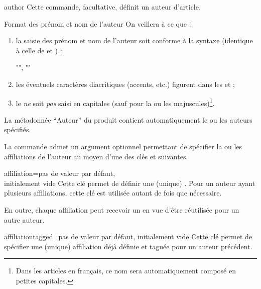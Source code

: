 \documentclass[french,nolocaltoc]{nwejmart}
\newtheorem[style=definition]{fait}
\newtheorem[title=expérience]{experience}
\newtheorem[title-plural=anneaux]{anneau}
\newtheorem[title=idéal,title-plural=idéaux]{ideal}
\begin{document}
\begin{docCommand}{author}{}
  Cette commande, facultative, définit un auteur d'article.
\end{docCommand}
%
\begin{dbwarning}{Format des prénom et nom de l'auteur}{}
  On veillera à ce que :
  \begin{enumerate}
  \item la saisie des prénom et nom de l'auteur soit conforme à la syntaxe
    (identique à celle de  et ) :
\begin{bodycode}[listing options={showspaces}]
"", ""
\end{bodycode}
  \item les éventuels caractères diacritiques (accents, etc.) figurent dans les
     et  ;
  \item le  \emph{ne} soit \emph{pas} saisi en capitales (sauf pour la
    ou les majuscules)\footnote{Dans les articles en français, ce nom sera
      automatiquement composé en petites capitales.}.
  \end{enumerate}

  La métadonnée \enquote{Auteur} du  produit contient automatiquement
  le ou les auteurs spécifiés.
\end{dbwarning}

La commande  admet un argument optionnel permettant de spécifier
la ou les affiliations de l'auteur au moyen d'une des clés 
et  suivantes.

\begin{docKey}{affiliation}{={}}{pas de valeur par défaut,\\initialement vide}
  Cette clé permet de définir une (unique) . Pour un auteur
  ayant plusieurs affiliations, cette clé est utilisée autant de fois que
  nécessaire.

  En outre, chaque affiliation peut recevoir un  en vue d'être
  réutilisée pour un autre auteur.
\end{docKey}

\begin{docKey}{affiliationtagged}{={}}{pas de valeur par défaut,
    initialement vide}
  Cette clé permet de spécifier une (unique) affiliation déjà définie et taguée
  pour un auteur précédent.
\end{docKey}
\end{document}
